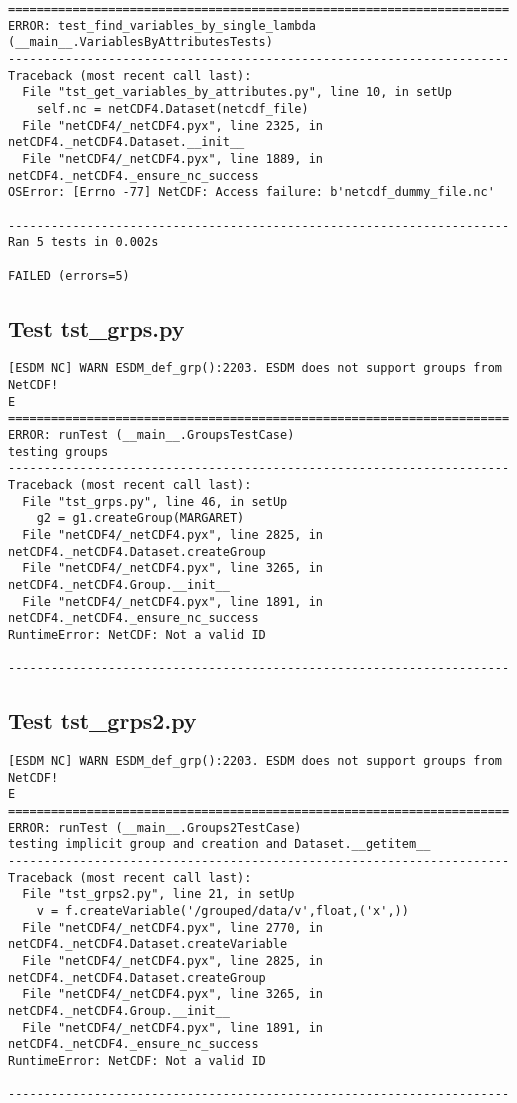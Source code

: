 \begin{verbatim}
======================================================================
ERROR: test_find_variables_by_single_lambda (__main__.VariablesByAttributesTests)
----------------------------------------------------------------------
Traceback (most recent call last):
  File "tst_get_variables_by_attributes.py", line 10, in setUp
    self.nc = netCDF4.Dataset(netcdf_file)
  File "netCDF4/_netCDF4.pyx", line 2325, in netCDF4._netCDF4.Dataset.__init__
  File "netCDF4/_netCDF4.pyx", line 1889, in netCDF4._netCDF4._ensure_nc_success
OSError: [Errno -77] NetCDF: Access failure: b'netcdf_dummy_file.nc'

----------------------------------------------------------------------
Ran 5 tests in 0.002s

FAILED (errors=5)
\end{verbatim}

\subsection{Test tst\_grps.py}

\begin{verbatim}
[ESDM NC] WARN ESDM_def_grp():2203. ESDM does not support groups from NetCDF!
E
======================================================================
ERROR: runTest (__main__.GroupsTestCase)
testing groups
----------------------------------------------------------------------
Traceback (most recent call last):
  File "tst_grps.py", line 46, in setUp
    g2 = g1.createGroup(MARGARET)
  File "netCDF4/_netCDF4.pyx", line 2825, in netCDF4._netCDF4.Dataset.createGroup
  File "netCDF4/_netCDF4.pyx", line 3265, in netCDF4._netCDF4.Group.__init__
  File "netCDF4/_netCDF4.pyx", line 1891, in netCDF4._netCDF4._ensure_nc_success
RuntimeError: NetCDF: Not a valid ID

----------------------------------------------------------------------
\end{verbatim}

\subsection{Test tst\_grps2.py}

\begin{verbatim}
[ESDM NC] WARN ESDM_def_grp():2203. ESDM does not support groups from NetCDF!
E
======================================================================
ERROR: runTest (__main__.Groups2TestCase)
testing implicit group and creation and Dataset.__getitem__
----------------------------------------------------------------------
Traceback (most recent call last):
  File "tst_grps2.py", line 21, in setUp
    v = f.createVariable('/grouped/data/v',float,('x',))
  File "netCDF4/_netCDF4.pyx", line 2770, in netCDF4._netCDF4.Dataset.createVariable
  File "netCDF4/_netCDF4.pyx", line 2825, in netCDF4._netCDF4.Dataset.createGroup
  File "netCDF4/_netCDF4.pyx", line 3265, in netCDF4._netCDF4.Group.__init__
  File "netCDF4/_netCDF4.pyx", line 1891, in netCDF4._netCDF4._ensure_nc_success
RuntimeError: NetCDF: Not a valid ID

----------------------------------------------------------------------
\end{verbatim}


